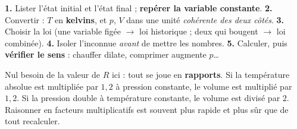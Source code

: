 \documentclass[11pt,a4paper]{article}
\begin{document}
\begin{methode}
\textbf{1.} Lister l'état initial et l'état final ; \textbf{repérer la variable constante}. \quad
\textbf{2.} Convertir : $T$ en \textbf{kelvins}, et $p$, $V$ dans une unité \emph{cohérente des deux
côtés}. \quad
\textbf{3.} Choisir la loi (une variable figée $\to$ loi historique ; deux qui bougent $\to$ loi
combinée). \quad
\textbf{4.} Isoler l'inconnue \emph{avant} de mettre les nombres. \quad
\textbf{5.} Calculer, puis \textbf{vérifier le sens} : chauffer dilate, comprimer augmente $p$\dots
\end{methode}

\begin{idee}
Nul besoin de la valeur de $R$ ici : tout se joue en \textbf{rapports}. Si la température absolue est
multipliée par $1{,}2$ à pression constante, le volume est multiplié par $1{,}2$. Si la pression double
à température constante, le volume est divisé par $2$. Raisonner en facteurs multiplicatifs est souvent
plus rapide et plus sûr que de tout recalculer.
\end{idee}
\end{document}
